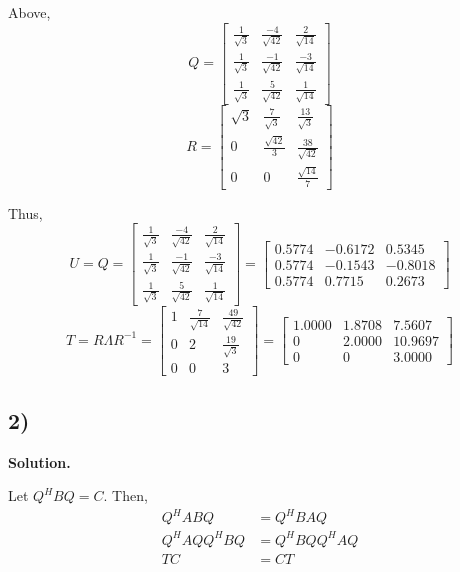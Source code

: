 \documentclass{article}
\newcommand{\0}{{\mathbf{0}}} %
\begin{document}
Above,
$$Q =
\begin{bmatrix} \frac{1}{\sqrt{3}} & \frac{-4}{\sqrt{42}} & \frac{2}{\sqrt{14}} \\
\frac{1}{\sqrt{3}} & \frac{-1}{\sqrt{42}} & \frac{-3}{\sqrt{14}} \\
\frac{1}{\sqrt{3}} & \frac{5}{\sqrt{42}} & \frac{1}{\sqrt{14}}
\end{bmatrix}$$
$$R =
\begin{bmatrix}
\sqrt{3} & \frac{7}{\sqrt{3}} & \frac{13}{\sqrt{3}} \\
0 & \frac{\sqrt{42}}{3} & \frac{38}{\sqrt{42}} \\
0 & 0 & \frac{\sqrt{14}}{7}
\end{bmatrix}$$

Thus,
$$
U = Q =
\begin{bmatrix} \frac{1}{\sqrt{3}} & \frac{-4}{\sqrt{42}} & \frac{2}{\sqrt{14}} \\
\frac{1}{\sqrt{3}} & \frac{-1}{\sqrt{42}} & \frac{-3}{\sqrt{14}} \\
\frac{1}{\sqrt{3}} & \frac{5}{\sqrt{42}} & \frac{1}{\sqrt{14}}
\end{bmatrix}
=
\begin{bmatrix} 0.5774 & -0.6172 & 0.5345 \\ 0.5774 & -0.1543 & -0.8018 \\ 0.5774 & 0.7715 & 0.2673
\end{bmatrix}
$$
$$
T = R \Lambda R^{-1} =
\begin{bmatrix}
1 & \frac{7}{\sqrt{14}} & \frac{49}{\sqrt{42}} \\
0 & 2 & \frac{19}{\sqrt{3}} \\
0 & 0 & 3
\end{bmatrix}
=
\begin{bmatrix}
1.0000 & 1.8708 & 7.5607 \\
0 & 2.0000 & 10.9697 \\
0 & 0 & 3.0000
\end{bmatrix}
$$

\subsection*{2)}

\textbf{Solution.}

Let $Q^H B Q = C$.
Then,
\begin{align*}
Q^H AB Q &= Q^H BA Q  \\
Q^H A Q Q^H B Q&=Q^H B Q Q^H A Q  \\
TC &= CT
\end{align*}
\end{document}
